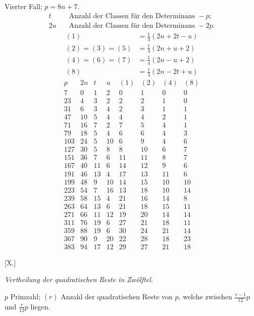 Vierter Fall; $p=8n+7$.
\[
\begin{aligned}
t&\quad\text{Anzahl der Classen für den Determinans }-p;\\
2u&\quad\text{Anzahl der Classen für den Determinans }-2p.
\end{aligned}
\]
\[
\begin{aligned}
(1)&=\tfrac14(2n+2t-u)\\
(2)=(3)=(5)&=\tfrac14(2n+u+2)\\
(4)=(6)=(7)&=\tfrac14(2n-u+2)\\
(8)&=\tfrac14(2n-2t+u)
\end{aligned}
\]
\[
\begin{array}{r|r|r|r|r|r|r|r}
p&2n&t&u&(1)&(2)&(4)&(8)\\\hline
7&0&1&2&0&1&0&0\\
23&4&3&2&2&2&1&0\\
31&6&3&4&2&3&1&1\\
47&10&5&4&4&4&2&1\\
71&16&7&2&7&5&4&1\\
79&18&5&4&6&6&4&3\\
103&24&5&10&6&9&4&6\\
127&30&5&8&8&10&6&7\\
151&36&7&6&11&11&8&7\\
167&40&11&6&14&12&9&6\\
191&46&13&4&17&13&11&6\\
199&48&9&10&14&15&10&10\\
223&54&7&16&13&18&10&14\\
239&58&15&4&21&16&14&8\\
263&64&13&6&21&18&15&11\\
271&66&11&12&19&20&14&14\\
311&76&19&6&27&21&18&11\\
359&88&19&6&30&24&21&14\\
367&90&9&20&22&28&18&23\\
383&94&17&12&29&27&21&18
\end{array}
\]

%
\par\bigskip{}\centerline{[X.]}\medskip
\begin{center}\emph{Vertheilung der quadratischen Reste in Zwölftel.}\end{center}
$p$ Primzahl; $(r)$ Anzahl der quadratischen Reste von $p$, welche zwischen $\frac{r-1}{12}p$ und $\frac r{12}p$ liegen.

